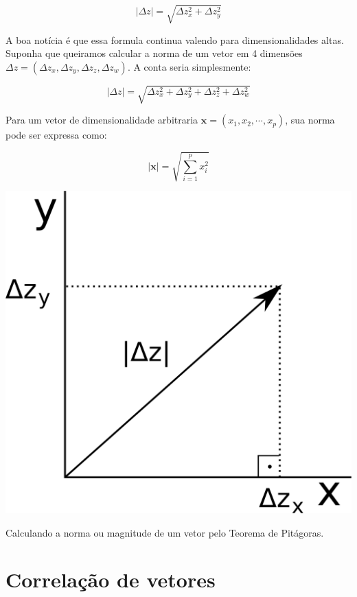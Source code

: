 \documentclass[portuges,]{tufte-handout}
\begin{document}
\[
|\Delta z| = \sqrt{\Delta z_x^2 + \Delta z_y^2}
\]

A boa notícia é que essa formula continua valendo para dimensionalidades
altas. Suponha que queiramos calcular a norma de um vetor em 4 dimensões
$\Delta z = (\Delta z_x, \Delta z_y, \Delta z_z, \Delta z_w)$. A conta
seria simplesmente:

\[
|\Delta z| = \sqrt{\Delta z_x^2 + \Delta z_y^2+ \Delta z_z^2 + \Delta z_w^2}
\]

Para um vetor de dimensionalidade arbitraria
$\mathbf{x} = (x_1, x_2, \cdots, x_p)$, sua norma pode ser expressa
como:

\[
|\mathbf{x}| = \sqrt{\sum_{i=1}^p x_i^2}
\]

\begin{marginfigure}
\includegraphics{./figuras/pitagoras.png}
\caption{Calculando a norma ou magnitude de um vetor pelo
Teorema de Pitágoras.}
\label{pitagoras}
\end{marginfigure}

\section{Correlação de vetores}\label{correlauxe7uxe3o-de-vetores}
\end{document}
